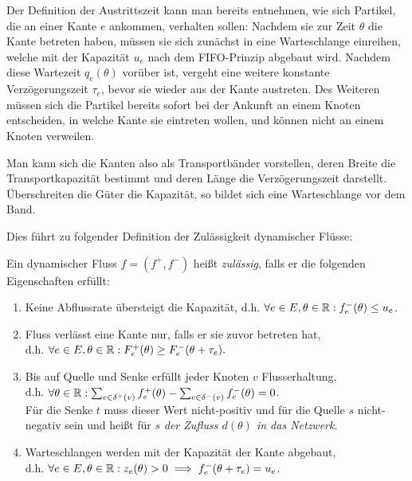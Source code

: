 Der Definition der Austrittszeit kann man bereits entnehmen, wie sich Partikel, die an einer Kante $e$ ankommen, verhalten sollen:
Nachdem sie zur Zeit $\theta$ die Kante betreten haben, müssen sie sich zunächst in eine Warteschlange einreihen, welche mit der Kapazität $u_e$ nach dem FIFO-Prinzip abgebaut wird.
Nachdem diese Wartezeit $q_e(\theta)$ vorüber ist, vergeht eine weitere konstante Verzögerungszeit $\tau_e$, bevor sie wieder aus der Kante austreten.
Des Weiteren müssen sich die Partikel bereits sofort bei der Ankunft an einem Knoten entscheiden, in welche Kante sie eintreten wollen, und können nicht an einem Knoten verweilen.

Man kann sich die Kanten also als Transportbänder vorstellen, deren Breite die Transportkapazität bestimmt und deren Länge die Verzögerungszeit darstellt.
Überschreiten die Güter die Kapazität, so bildet sich eine Warteschlange vor dem Band.

Dies führt zu folgender Definition der Zulässigkeit dynamischer Flüsse:

\begin{definition}
	Ein dynamischer Fluss $f=(f^+, f^-)$ heißt \emph{zulässig}, falls er die folgenden Eigenschaften erfüllt:
	\begin{enumerate}[label=(F\arabic*)]
		\item\label{def-feasible-flow-capacity} Keine Abflussrate übersteigt die Kapazität, d.h. $\forall e\in E, \theta\in\mathbb{R}: f_e^-(\theta)\leq u_e$.
		\item\label{def-feasible-flow-no-negative-flow} Fluss verlässt eine Kante nur, falls er sie zuvor betreten hat,\\ d.h. $\forall e\in E, \theta\in\mathbb{R}: F_e^+(\theta) \geq F_e^-(\theta + \tau_e).$
		\item\label{def-feasible-flow-no-flow-at-node} Bis auf Quelle und Senke erfüllt jeder Knoten $v$ Flusserhaltung,\\
		d.h. $\forall\theta\in\mathbb{R}: \sum_{e\in\delta^+(v)}f^+_e(\theta) - \sum_{e\in\delta^-(v)} f_e^-(\theta) = 0$.\\
		Für die Senke $t$ muss dieser Wert nicht-positiv und für die Quelle $s$ nicht-negativ sein und heißt für $s$ \emph{der Zufluss $d(\theta)$ in das Netzwerk}.
		\item\label{def-feasible-flow-queue-with-capacity} Warteschlangen werden mit der Kapazität der Kante abgebaut,\\ d.h. $\forall e\in E, \theta\in\mathbb{R}: z_e(\theta) > 0 \implies f_e^-(\theta + \tau_e) = u_e$.
	\end{enumerate}
\end{definition}

